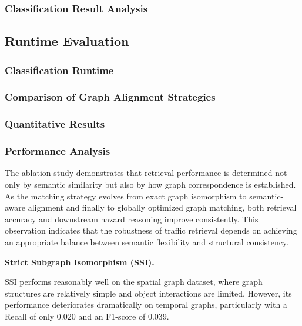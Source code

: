 \documentclass[a4paper, 11pt]{article} %
\begin{document}
\subsubsection{Classification Result Analysis}

\subsection{Runtime Evaluation}



\subsubsection{Classification Runtime}


\subsubsection{Comparison of Graph Alignment Strategies}



\subsubsection{Quantitative Results}



\subsubsection{Performance Analysis}

The ablation study demonstrates that retrieval performance is determined not only by semantic similarity but also by how graph correspondence is established. As the matching strategy evolves from exact graph isomorphism to semantic-aware alignment and finally to globally optimized graph matching, both retrieval accuracy and downstream hazard reasoning improve consistently. This observation indicates that the robustness of traffic retrieval depends on achieving an appropriate balance between semantic flexibility and structural consistency.

\textbf{Strict Subgraph Isomorphism (SSI).}

SSI performs reasonably well on the spatial graph dataset, where graph structures are relatively simple and object interactions are limited. However, its performance deteriorates dramatically on temporal graphs, particularly with a Recall of only 0.020 and an F1-score of 0.039.
\end{document}
